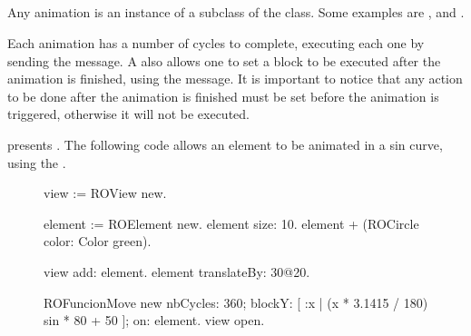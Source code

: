 \documentclass[a4paper,10pt,twoside]{book}
\begin{document}
%
%

\subsection*{}
Any animation is an instance of a subclass of the  class. Some examples are ,  and .

Each animation has a number of cycles to complete, executing each one by sending the  message.
A  also allows one to set a block to be executed after the animation is finished, using the  message. It is important to notice that any action to be done after the animation is finished must be set before the animation is triggered, otherwise it will not be executed.  

 presents . The following code allows an element to be animated in a sin curve, using the .

\begin{figure}[H]
\begin{code}{}
view := ROView new.

element := ROElement new.
element size: 10.
element + (ROCircle color: Color green).

view add: element.
element translateBy: 30@20.

ROFuncionMove new
	nbCycles: 360;
	blockY: [ :x | (x * 3.1415 / 180) sin * 80 + 50 ];
	on: element.
view open.
\end{code}
\label{fig:animationCode}
\end{figure}
\end{document}
